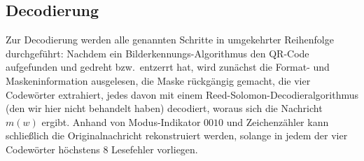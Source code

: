 \subsection{Decodierung}
Zur Decodierung werden alle genannten Schritte in umgekehrter Reihenfolge durchgeführt: Nachdem ein Bilderkennungs-Algorithmus den QR-Code aufgefunden und gedreht bzw.\ entzerrt hat, wird zunächst die Format- und Maskeninformation ausgelesen, die Maske rückgängig gemacht, die vier Codewörter extrahiert, jedes davon mit einem Reed-Solomon-Decodieralgorithmus (den wir hier nicht behandelt haben) decodiert, woraus sich die Nachricht $m(w)$ ergibt. Anhand von Modus-Indikator $0010$ und Zeichenzähler kann schließlich die Originalnachricht rekonstruiert werden, solange in jedem der vier Codewörter höchstens $8$ Lesefehler vorliegen.
\begin{Center}
\end{Center}